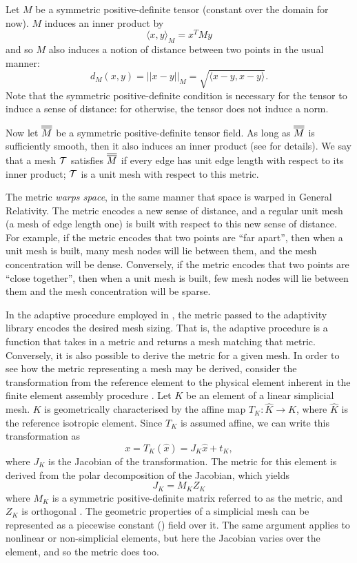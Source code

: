 Let $M$ be a symmetric positive-definite tensor (constant over the domain for now).
$M$ induces an inner product by
\begin{equation}
\langle x, y\rangle_M = x^T M y
\end{equation}
and so $M$ also induces a notion of distance between two points in the usual manner:
\begin{equation}
d_M(x, y) = ||x - y||_M = \sqrt{\langle x - y, x - y \rangle}.
\end{equation}
Note that the symmetric positive-definite condition is necessary for the tensor
to induce a sense of distance: for otherwise, the tensor does not induce
a norm. 

Now let $\overline{\overline{M}}$ be a symmetric positive-definite tensor field. As long as
$\overline{\overline{M}}$ is sufficiently smooth, then it also induces an inner product
(see \citet{simpson1994} for details). We say that a mesh $\cal{T}$ satisfies
$\overline{\overline{M}}$ if every edge has unit edge length with respect to its inner product;
$\cal{T}$ is a unit mesh with respect to this metric.

The metric \emph{warps space}, in the same manner that space is warped in General Relativity.
The metric encodes a new sense of distance, and a regular unit mesh (a mesh of edge length
one) is built with respect to this new sense of distance. For example, if the metric encodes
that two points are ``far apart'', then when a unit mesh is built, many mesh
nodes will lie between them, and the mesh concentration will be dense. Conversely, if the metric
encodes that two points are ``close together'', then when a unit mesh is built,
few mesh nodes will lie between them and the mesh concentration will be sparse.

In the adaptive procedure employed in \fluidity, the metric passed to the adaptivity
library encodes the desired mesh sizing. That is, the adaptive procedure is a function
that takes in a metric and returns a mesh matching that metric. Conversely, it is also
possible to derive the metric for a given mesh. In order to see how the metric representing a mesh may be derived, consider the transformation from the reference element to the physical
element inherent in the finite element assembly procedure \citep{femtools}.
Let $K$ be an element of a linear simplicial mesh. $K$ is geometrically characterised by the affine map
$T_K: \hat{K} \rightarrow K$, where $\hat{K}$ is the reference isotropic element. Since
$T_K$ is assumed affine, we can write this transformation as
\begin{equation}
x = T_K(\hat{x}) = J_K\hat{x} + t_K,
\end{equation}
where $J_K$ is the Jacobian of the transformation. The metric for this element is derived
from the polar decomposition of the Jacobian, which yields
\begin{equation}
J_K = M_K Z_K
\end{equation}
where $M_K$ is a symmetric positive-definite matrix referred to as the metric,
and $Z_K$ is orthogonal \citep{micheletti2006}. The geometric properties of a simplicial mesh can be represented
as a piecewise constant (\Pzero) field over it. The same argument applies to
nonlinear or non-simplicial elements, but here the Jacobian varies over the element,
and so the metric does too.

